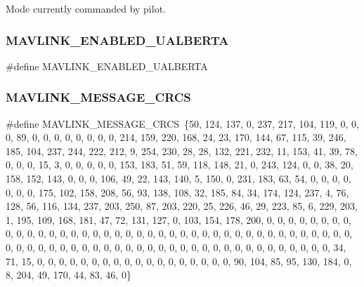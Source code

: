 Mode currently commanded by pilot. 

\mbox{\label{ualberta_8h_ab91d47d65880e4522bdc0041b36fa7d6}} 
\subsubsection{M\+A\+V\+L\+I\+N\+K\+\_\+\+E\+N\+A\+B\+L\+E\+D\+\_\+\+U\+A\+L\+B\+E\+R\+TA}
{\footnotesize\ttfamily \#define M\+A\+V\+L\+I\+N\+K\+\_\+\+E\+N\+A\+B\+L\+E\+D\+\_\+\+U\+A\+L\+B\+E\+R\+TA}

\mbox{\label{ualberta_8h_a3f709d5835acb54a11202a5fdc7a6bfe}} 
\subsubsection{M\+A\+V\+L\+I\+N\+K\+\_\+\+M\+E\+S\+S\+A\+G\+E\+\_\+\+C\+R\+CS}
{\footnotesize\ttfamily \#define M\+A\+V\+L\+I\+N\+K\+\_\+\+M\+E\+S\+S\+A\+G\+E\+\_\+\+C\+R\+CS~\{50, 124, 137, 0, 237, 217, 104, 119, 0, 0, 0, 89, 0, 0, 0, 0, 0, 0, 0, 0, 214, 159, 220, 168, 24, 23, 170, 144, 67, 115, 39, 246, 185, 104, 237, 244, 222, 212, 9, 254, 230, 28, 28, 132, 221, 232, 11, 153, 41, 39, 78, 0, 0, 0, 15, 3, 0, 0, 0, 0, 0, 153, 183, 51, 59, 118, 148, 21, 0, 243, 124, 0, 0, 38, 20, 158, 152, 143, 0, 0, 0, 106, 49, 22, 143, 140, 5, 150, 0, 231, 183, 63, 54, 0, 0, 0, 0, 0, 0, 0, 175, 102, 158, 208, 56, 93, 138, 108, 32, 185, 84, 34, 174, 124, 237, 4, 76, 128, 56, 116, 134, 237, 203, 250, 87, 203, 220, 25, 226, 46, 29, 223, 85, 6, 229, 203, 1, 195, 109, 168, 181, 47, 72, 131, 127, 0, 103, 154, 178, 200, 0, 0, 0, 0, 0, 0, 0, 0, 0, 0, 0, 0, 0, 0, 0, 0, 0, 0, 0, 0, 0, 0, 0, 0, 0, 0, 0, 0, 0, 0, 0, 0, 0, 0, 0, 0, 0, 0, 0, 0, 0, 0, 0, 0, 0, 0, 0, 0, 0, 0, 0, 0, 0, 0, 0, 0, 0, 0, 0, 0, 0, 0, 0, 0, 0, 0, 0, 0, 0, 0, 34, 71, 15, 0, 0, 0, 0, 0, 0, 0, 0, 0, 0, 0, 0, 0, 0, 0, 0, 0, 0, 90, 104, 85, 95, 130, 184, 0, 8, 204, 49, 170, 44, 83, 46, 0\}}

